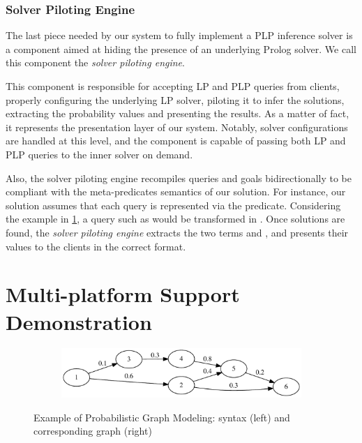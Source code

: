 \documentclass[12pt,a4paper,openright,twoside]{book}
\begin{document}
\subsubsection{Solver Piloting Engine}

The last piece needed by our system to fully implement a PLP inference solver is a component aimed at hiding the presence of an underlying Prolog solver.
%
We call this component the \emph{solver piloting engine}.

This component is responsible for accepting LP and PLP queries from clients, properly configuring the underlying LP solver, piloting it to infer the solutions, extracting the probability values and presenting the results.
%
As a matter of fact, it represents the presentation layer of our system.
%
Notably, solver configurations are handled at this level, and the component is capable of passing both LP and PLP queries to the inner solver on demand.

Also, the solver piloting engine recompiles queries and goals bidirectionally to be compliant with the meta-predicates semantics of our solution.
%
For instance, our solution assumes that each query is represented via the  predicate.
%
Considering the example in \cref{fig:valid-probabilistic-graph}, a query such as  would be transformed in  .
%
Once solutions are found, the \emph{solver piloting engine} extracts the two terms  and , and presents their values to the clients in the correct format.

\section{Multi-platform Support Demonstration}

\begin{figure}[t]
    \begin{subfigure}{0.4\textwidth}
        
    \end{subfigure}
    \begin{subfigure}{0.57\linewidth}
        \includegraphics[width=\linewidth]{figures/valid-probabilistic-graph.pdf}
    \end{subfigure}
    \caption[Example of Probabilistic Graph Modeling: \problog{} syntax and corresponding graph]{Example of Probabilistic Graph Modeling: \problog{} syntax (left) and corresponding graph (right)}
    \label{fig:valid-probabilistic-graph}
\end{figure}
\end{document}
